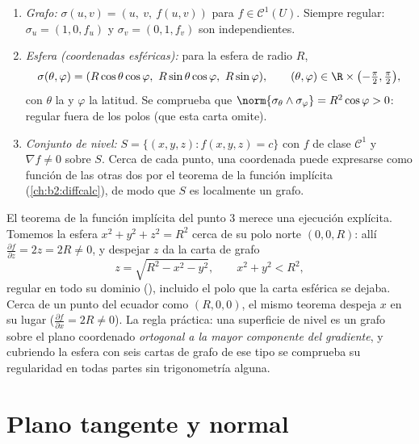 \begin{example}\label{ex:b2:surfaces:standard}
\leavevmode
\begin{enumerate}
\item \emph{Grafo:} $\sigma(u, v) = (u,\ v,\ f(u, v))$ para $f \in
\mathcal{C}^1(U)$. Siempre regular: $\sigma_u = (1, 0, f_u)$ y
$\sigma_v = (0, 1, f_v)$ son independientes.
\item \emph{Esfera (coordenadas esféricas):} para la esfera de radio
$R$,
\[
\sigma(\theta, \varphi)
= (R\cos\theta\cos\varphi,\ R\sin\theta\cos\varphi,\
R\sin\varphi),
\qquad
(\theta, \varphi) \in \R \times
\bigl(-\tfrac\pi2, \tfrac\pi2\bigr),
\]
con $\theta$ la  y $\varphi$ la latitud. Se comprueba que
$\norm{\sigma_\theta \wedge \sigma_\varphi} = R^2\cos\varphi > 0$:
regular fuera de los polos (que esta carta omite).
\item \emph{Conjunto de nivel:} $S = \{(x,y,z) : f(x, y, z) = c\}$
con $f$ de clase $\mathcal{C}^1$ y $\nabla f \neq 0$ sobre $S$.
Cerca de cada punto, una coordenada puede expresarse como función de
las otras dos por el teorema de la función implícita
(\cref{ch:b2:diffcalc}), de modo que $S$ es localmente un grafo.
\end{enumerate}
\end{example}

\begin{example}
\label{ex:b2:surfaces:levelgraph}
El teorema de la función implícita del punto 3 merece una ejecución
explícita. Tomemos la esfera $x^2 + y^2 + z^2 = R^2$ cerca de su polo
norte $(0, 0, R)$: allí $\frac{\partial f}{\partial z} = 2z = 2R \neq
0$, y despejar $z$ da la carta de grafo
\[
z = \sqrt{R^2 - x^2 - y^2},
\qquad x^2 + y^2 < R^2 ,
\]
regular en todo su dominio (), incluido el polo que la carta
esférica se dejaba. Cerca de un punto del ecuador como $(R, 0, 0)$,
el mismo teorema despeja $x$ en su lugar ($\frac{\partial f}{\partial
x} = 2R \neq 0$). La regla práctica: una superficie de nivel es un
grafo sobre el plano coordenado \emph{ortogonal a la mayor componente
del gradiente}, y cubriendo la esfera con seis cartas de grafo de ese
tipo se comprueba su regularidad en todas partes sin trigonometría
alguna.
\end{example}

\section{Plano tangente y normal}

